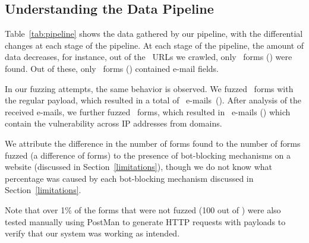 
\subsection[The Pipeline]{Understanding the Data Pipeline}

Table~\ref{tab:pipeline} shows the data gathered by our pipeline, with the differential changes at each stage of the pipeline. At each stage of the pipeline, the amount of data decreases, for instance, out of the \urls\ URLs we crawled, only \forms\ forms (\formsDelta) were found. Out of these, only \emailforms\ forms (\emailformsDelta) contained e-mail fields.

In our fuzzing attempts, the same behavior is observed. We fuzzed \fuzzed\ forms with the regular payload, which resulted in a total of \recd\ e-mails~(\recdDelta). After analysis of the received e-mails, we further fuzzed \malfuzzed\ forms, which resulted in \success\ e-mails (\successDelta) which contain the vulnerability across \ips IP addresses from \domains domains.

We attribute the difference in the number of forms found to the number of forms fuzzed (a difference of \diffFoundFuzz forms) to the presence of bot-blocking mechanisms on a website (discussed in Section~\ref{limitations}), though we do not know what percentage was caused by each bot-blocking mechanism discussed in Section~\ref{limitations}. 

Note that over 1\% of the forms that were not fuzzed (100 out of \diffFoundFuzz) were also tested manually using PostMan to generate HTTP requests with payloads to verify that our system was working as intended.




